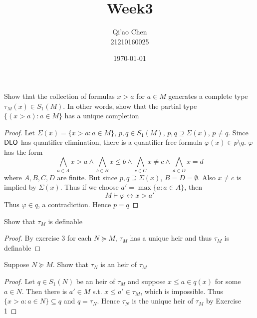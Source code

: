 \documentclass[11pt]{article}
\author{Qi'ao Chen\\21210160025}
\date{\today}
\title{Week3}
\begin{document}
\maketitle
\begin{exercise}
Show that the collection of formulas \(x>a\) for \(a\in M\) generates a complete
type \(\tau_M(x)\in S_1(M)\). In other words, show that the partial type \(\{(x>a):a\in M\}\) has a unique
completion
\end{exercise}

\begin{proof}
Let \(\Sigma(x)=\{x>a:a\in M\}\), \(p,q\in S_1(M)\), \(p,q\supseteq \Sigma(x)\), \(p\neq q\). Since \(\operatorname{\textsf{DLO}}\) has quantifier
elimination, there is a quantifier free formula \(\varphi(x)\in p\setminus q\). \(\varphi\) has the form
\begin{equation*}
\bigwedge_{a\in A}x>a\wedge\bigwedge_{b\in B}x\le b\wedge\bigwedge_{c\in C}x\neq c\wedge\bigwedge_{d\in D}x=d
\end{equation*}
where \(A,B,C,D\) are finite. But since \(p,q\supseteq\Sigma(x)\), \(B=D=\emptyset\). Also \(x\neq c\) is implied
by \(\Sigma(x)\). Thus if we choose \(a'=\max\{a:a\in A\}\), then
\begin{equation*}
M\vdash\varphi\leftrightarrow x>a'
\end{equation*}
Thus \(\varphi\in q\), a contradiction. Hence \(p=q\)
\end{proof}

\begin{exercise}
Show that \(\tau_M\) is definable
\end{exercise}

\begin{proof}
By exercise 3 for each \(N\succeq M\), \(\tau_M\) has a unique heir and thus \(\tau_M\) is definable
\end{proof}

\begin{exercise}
Suppose \(N\succeq M\). Show that \(\tau_N\) is an heir of \(\tau_M\)
\end{exercise}

\begin{proof}
Let \(q\in S_1(N)\) be an heir of \(\tau_M\) and suppose \(x\le a\in q(x)\)  for some \(a\in N\). Then there
is \(a'\in M\) s.t. \(x\le a'\in\tau_M\), which is impossible. Thus \(\{x>a:a\in N\}\subseteq q\) and \(q=\tau_N\).
Hence \(\tau_N\) is the unique heir of \(\tau_M\) by Exercise 1
\end{proof}
\end{document}
